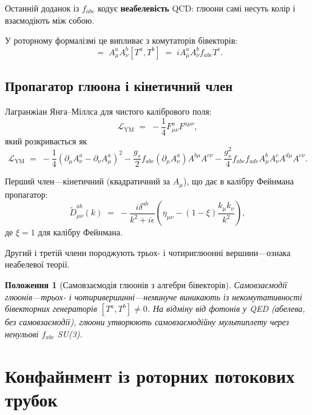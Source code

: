 \documentclass[11pt,a4paper]{article}
\newcommand{\Lag}{\mathcal{L}}
\theoremstyle{definition}
\theoremstyle{plain}
\newtheorem{proposition}{Положення}[section]
\theoremstyle{remark}
\begin{document}
Останній доданок із $f_{abc}$ кодує \textbf{неабелевість} QCD: глюони самі несуть колір і взаємодіють між собою.

У роторному формалізмі це випливає з комутаторів бівекторів:
\begin{equation}
[A_\mu,A_\nu] \;=\; A_\mu^a A_\nu^b [T^a,T^b] \;=\; i A_\mu^a A_\nu^b f_{abc} T^c.
\end{equation}

\subsection{Пропагатор глюона і кінетичний член}

Лагранжіан Янга–Міллса для чистого калібрового поля:
\begin{equation}
\Lag_{\mathrm{YM}} \;=\; -\frac{1}{4}F_{\mu\nu}^a F^{a\mu\nu},
\label{eq:yang-mills-lagrangian}
\end{equation}
який розкривається як
\begin{equation}
\Lag_{\mathrm{YM}} \;=\; -\frac{1}{4}(\partial_\mu A_\nu^a - \partial_\nu A_\mu^a)^2 - \frac{g_s}{2}f_{abc}(\partial_\mu A_\nu^a)A^{b\mu}A^{c\nu} - \frac{g_s^2}{4}f_{abc}f_{ade}A_\mu^b A_\nu^c A^{d\mu}A^{e\nu}.
\end{equation}

Перший член—кінетичний (квадратичний за $A_\mu$), що дає в калібру Фейнмана пропагатор:
\begin{equation}
\tilde{D}_{\mu\nu}^{ab}(k) \;=\; -\frac{i\delta^{ab}}{k^2 + i\epsilon}\left(\eta_{\mu\nu} - (1-\xi)\frac{k_\mu k_\nu}{k^2}\right),
\end{equation}
де $\xi=1$ для калібру Фейнмана.

Другий і третій члени породжують трьох- і чотириглюонні вершини—ознака неабелевої теорії.

\begin{proposition}[Самовзаємодія глюонів з алгебри бівекторів]
Самовзаємодії глюонів—трьох- і чотиривершинні—неминуче виникають із некомутативності бівекторних генераторів $[T^a,T^b]\neq 0$. На відміну від фотонів у QED (абелева, без самовзаємодії), глюони утворюють самовзаємодійну мультиплету через ненульові $f_{abc}$ SU(3).
\end{proposition}

\vspace{1em}

\section{Конфайнмент із роторних потокових трубок}
\label{sec:confinement}
\end{document}
